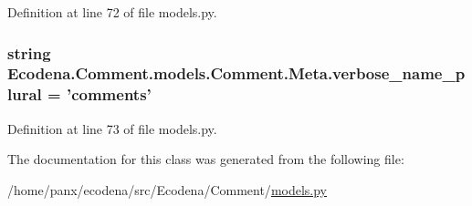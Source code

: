 Definition at line 72 of file models.py.

\hypertarget{class_ecodena_1_1_comment_1_1models_1_1_comment_1_1_meta_ab47cb8c6b3591a60ce7470138312f77a}{
\subsubsection[{verbose\_\-name\_\-plural}]{\setlength{\rightskip}{0pt plus 5cm}string {\bf Ecodena.Comment.models.Comment.Meta.verbose\_\-name\_\-plural} = 'comments'}}
\label{d4/d24/class_ecodena_1_1_comment_1_1models_1_1_comment_1_1_meta_ab47cb8c6b3591a60ce7470138312f77a}


Definition at line 73 of file models.py.



The documentation for this class was generated from the following file:\begin{DoxyCompactItemize}
\item 
/home/panx/ecodena/src/Ecodena/Comment/\hyperlink{_comment_2models_8py}{models.py}\end{DoxyCompactItemize}
